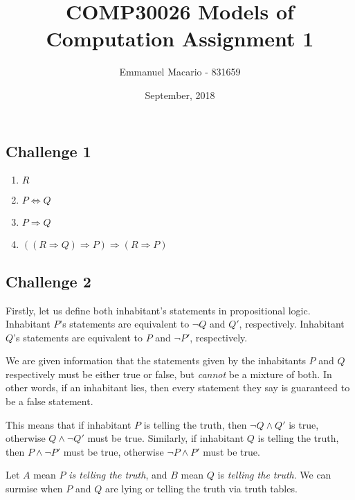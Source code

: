 \documentclass[12pt]{article}
\author{Emmanuel Macario - 831659}
\title{COMP30026 Models of Computation Assignment 1}
\date{September, 2018}
\newcommand{\impl}{\mathbin{\Rightarrow}}
\newcommand{\biim}{\mathbin{\Leftrightarrow}}
\begin{document}
\maketitle

\subsection*{Challenge 1}
\begin{enumerate}
    \item $R$
    \item $P \biim Q$
    \item $P \impl Q$
    \item $((R \impl Q) \impl P) \impl (R \impl P)$
\end{enumerate}


\subsection*{Challenge 2}

Firstly, let us define both inhabitant's statements in propositional logic.
Inhabitant $P$'s statements are equivalent to $\neg Q$ and $Q'$, respectively. 
Inhabitant $Q$'s statements are equivalent to $P$ and $\neg P'$, respectively.

\bigskip
\noindent
We are given information that the statements given by the inhabitants $P$ and $Q$ 
respectively must be either true or false, but \emph{cannot} be a mixture of both. 
In other words, if an inhabitant lies, then every statement they say is guaranteed to 
be a false statement.

\bigskip
\noindent
This means that if inhabitant $P$ is telling the truth, then $\neg Q \land Q'$ is true, 
otherwise $Q \land \neg Q'$ must be true. Similarly, if inhabitant $Q$ is telling the truth,
then $P \land \neg P'$ must be true, otherwise $\neg P \land P'$ must be true.


\bigskip
\noindent
Let $A$ mean $P$ \emph{is telling the truth}, and $B$ mean $Q$ is \emph{telling
the truth}. We can surmise when $P$ and $Q$ are lying or telling the truth via truth tables.
\end{document}
